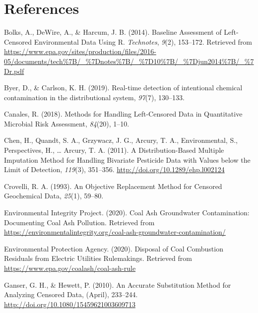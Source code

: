 \documentclass[12pt, twoside]{amherstthesis}
\newlength{\cslhangindent}
\newenvironment{cslreferences}%
  {\setlength{\parindent}{0pt}%
  \everypar{\setlength{\hangindent}{\cslhangindent}}\ignorespaces}%
  {\par}
\begin{document}
\backmatter

\hypertarget{references}{%
\chapter*{References}\label{references}}

\noindent

\setlength{\parindent}{-0.20in}
\setlength{\leftskip}{0.20in}
\setlength{\parskip}{8pt}

\hypertarget{refs}{}
\begin{cslreferences}
\leavevmode\hypertarget{ref-Bolks2014}{}%
Bolks, A., DeWire, A., \& Harcum, J. B. (2014). Baseline Assessment of Left-Censored Environmental Data Using R. \emph{Technotes}, \emph{9}(2), 153--172. Retrieved from \url{https://www.epa.gov/sites/production/files/2016-05/documents/tech\%7B/_\%7Dnotes\%7B/_\%7D10\%7B/_\%7Djun2014\%7B/_\%7Dr.pdf}

\leavevmode\hypertarget{ref-Byer2019}{}%
Byer, D., \& Carlson, K. H. (2019). Real-time detection of intentional chemical contamination in the distributional system, \emph{97}(7), 130--133.

\leavevmode\hypertarget{ref-Canales2018}{}%
Canales, R. (2018). Methods for Handling Left-Censored Data in Quantitative Microbial Risk Assessment, \emph{84}(20), 1--10.

\leavevmode\hypertarget{ref-Chen2011}{}%
Chen, H., Quandt, S. A., Grzywacz, J. G., Arcury, T. A., Environmental, S., Perspectives, H., \ldots{} Arcury, T. A. (2011). A Distribution-Based Multiple Imputation Method for Handling Bivariate Pesticide Data with Values below the Limit of Detection, \emph{119}(3), 351--356. \url{http://doi.org/10.1289/ehp.l002124}

\leavevmode\hypertarget{ref-Crovelli1993}{}%
Crovelli, R. A. (1993). An Objective Replacement Method for Censored Geochemical Data, \emph{25}(1), 59--80.

\leavevmode\hypertarget{ref-EIP2020}{}%
Environmental Integrity Project. (2020). Coal Ash Groundwater Contamination: Documenting Coal Ash Pollution. Retrieved from \url{https://environmentalintegrity.org/coal-ash-groundwater-contamination/}

\leavevmode\hypertarget{ref-Car2020}{}%
Environmental Protection Agency. (2020). Disposal of Coal Combustion Residuals from Electric Utilities Rulemakings. Retrieved from \url{https://www.epa.gov/coalash/coal-ash-rule}

\leavevmode\hypertarget{ref-Ganser2010}{}%
Ganser, G. H., \& Hewett, P. (2010). An Accurate Substitution Method for Analyzing Censored Data, (April), 233--244. \url{http://doi.org/10.1080/15459621003609713}


\end{cslreferences}
\end{document}
